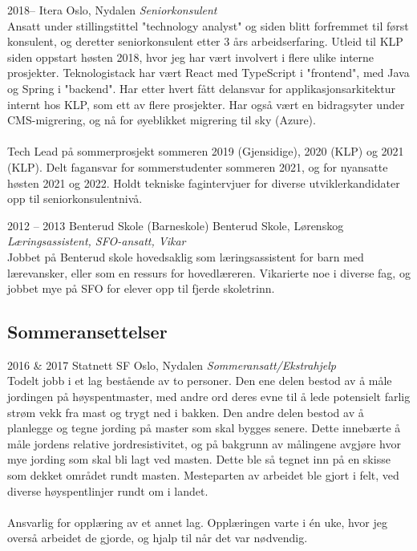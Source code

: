 \documentclass[]{friggeri-cv} %
\begin{document}
\begin{entrylist}

\entry
{2018--}
{Itera}
{Oslo, Nydalen}
{\emph{Seniorkonsulent} \\
Ansatt under stillingstittel "technology analyst" og siden blitt forfremmet til først konsulent, og deretter seniorkonsulent etter 3 års arbeidserfaring. Utleid til KLP siden oppstart høsten 2018, hvor jeg har vært involvert i flere ulike interne prosjekter. Teknologistack har vært React med TypeScript i "frontend", med Java og Spring i "backend". Har etter hvert fått delansvar for applikasjonsarkitektur internt hos KLP, som ett av flere prosjekter. Har også vært en bidragsyter under CMS-migrering, og nå for øyeblikket migrering til sky (Azure).
\\
\\
Tech Lead på sommerprosjekt sommeren 2019 (Gjensidige), 2020 (KLP) og 2021 (KLP). Delt fagansvar for sommerstudenter sommeren 2021, og for nyansatte høsten 2021 og 2022. Holdt tekniske fagintervjuer for diverse utviklerkandidater opp til seniorkonsulentnivå.
}


\entry
{2012 -- 2013}
{Benterud Skole (Barneskole)}
{Benterud Skole, Lørenskog}
{\emph{Læringsassistent, SFO-ansatt, Vikar} \\
Jobbet på Benterud skole hovedsaklig som læringsassistent for barn med lærevansker, eller som en ressurs for hovedlæreren. Vikarierte noe i diverse fag, og jobbet mye på SFO for elever opp til fjerde skoletrinn.}


\end{entrylist}

\subsection{Sommeransettelser}

\begin{entrylist}

\entry
{2016 \& 2017}
{Statnett SF}
{Oslo, Nydalen}
{\emph{Sommeransatt/Ekstrahjelp} \\
Todelt jobb i et lag bestående av to personer. Den ene delen bestod av å måle jordingen på høyspentmaster, med andre ord deres evne til å lede potensielt farlig strøm vekk fra mast og trygt ned i bakken. Den andre delen bestod av å planlegge og tegne jording på master som skal bygges senere. Dette innebærte å måle jordens relative jordresistivitet, og på bakgrunn av målingene avgjøre hvor mye jording som skal bli lagt ved masten. Dette ble så tegnet inn på en skisse som dekket området rundt masten. Mesteparten av arbeidet ble gjort i felt, ved diverse høyspentlinjer rundt om i landet.
\\
\\
Ansvarlig for opplæring av et annet lag. Opplæringen varte i \'{e}n uke, hvor jeg overså arbeidet de gjorde, og hjalp til når det var nødvendig.}

\end{entrylist}
\end{document}
